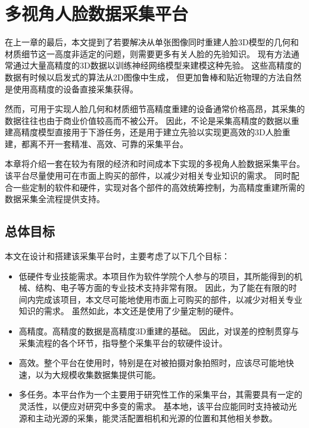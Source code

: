 \chapter{多视角人脸数据采集平台}
\label{chap:platform}

在上一章的最后，本文提到了若要解决从单张图像同时重建人脸3D模型的几何和材质细节这一高度非适定的问题，则需要更多有关人脸的先验知识。
现有方法通常通过大量高精度的3D数据以训练神经网络模型来建模这种先验。
这些高精度的数据有时候以启发式的算法从2D图像中生成，
但更加鲁棒和贴近物理的方法自然是使用高精度的设备直接采集获得。

然而，可用于实现人脸几何和材质细节高精度重建的设备通常价格高昂，其采集的数据往往也由于商业价值较高而不被公开。
因此，不论是采集高精度的数据以重建高精度模型直接用于下游任务，还是用于建立先验以实现更高效的3D人脸重建，都离不开一套精准、高效、可靠的采集平台。

本章将介绍一套在较为有限的经济和时间成本下实现的多视角人脸数据采集平台。
该平台尽量使用可在市面上购买的部件，以减少对相关专业知识的需求。
同时配合一些定制的软件和硬件，实现对各个部件的高效统筹控制，为高精度重建所需的数据采集全流程提供支持。

\section{总体目标}

本文在设计和搭建该采集平台时，主要考虑了以下几个目标：
\begin{itemize}
\item 低硬件专业技能需求。本项目作为软件学院个人参与的项目，其所能得到的机械、结构、电子等方面的专业技术支持非常有限。
因此，为了能在有限的时间内完成该项目，本文尽可能地使用市面上可购买的部件，以减少对相关专业知识的需求。
虽然如此，本文还是使用了少量定制的硬件。

\item 高精度。高精度的数据是高精度3D重建的基础。
因此，对误差的控制贯穿与采集流程的各个环节，指导整个采集平台的软硬件设计。

\item 高效。整个平台在使用时，特别是在对被拍摄对象拍照时，应该尽可能地快速，以为大规模收集数据集提供可能。

\item 多任务。本平台作为一个主要用于研究性工作的采集平台，其需要具有一定的灵活性，以便应对研究中多变的需求。
基本地，该平台应能同时支持被动光源和主动光源的采集，能灵活配置相机和光源的位置和其他相关参数。

\end{itemize}

